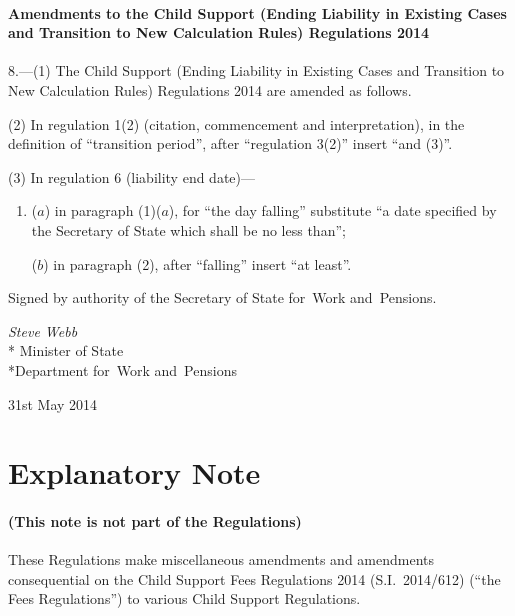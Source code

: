 \documentclass[12pt,a4paper]{article}
\begin{document}
\subsection[8. Amendments to the Child Support (Ending Liability in Existing Cases and Transition to New Calculation Rules) Regulations 2014]{Amendments to the Child Support (Ending Liability in Existing Cases and Transition to New Calculation Rules) Regulations 2014}

8.—(1) The Child Support (Ending Liability in Existing Cases and Transition to New Calculation Rules) Regulations 2014 are amended as follows.

(2) In regulation 1(2) (citation, commencement and interpretation), in the definition of “transition period”, after “regulation 3(2)” insert “and (3)”.

(3) In regulation 6 (liability end date)—
\begin{enumerate}\item[]
($a$) in paragraph (1)($a$), for “the day falling” substitute “a date specified by the Secretary of State which shall be no less than”;

($b$) in paragraph (2), after “falling” insert “at least”.
\end{enumerate}

\bigskip

\pagebreak[3]

Signed 
by authority of the 
Secretary of State for~Work and~Pensions.

{\raggedleft
\emph{Steve Webb}\\*
Minister
of State\\*Department 
for~Work and~Pensions

}

31st May 2014

\small

\part{Explanatory Note}

\renewcommand\parthead{— Explanatory Note}

\subsection*{(This note is not part of the Regulations)}

These Regulations make miscellaneous amendments and amendments consequential on the Child Support Fees Regulations 2014 (S.I.~2014/612) (“the Fees Regulations”) to various Child Support Regulations.
\end{document}
